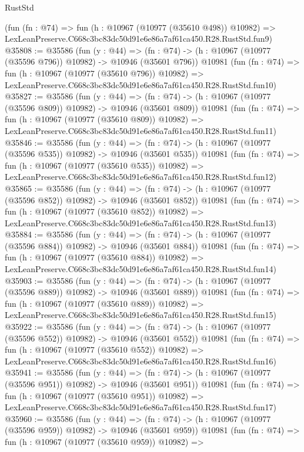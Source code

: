 \begin{lexlean}{RustStd}
\begin{coremodule}
    (fun (fn : @74) =>
    fun (h : @10967 (@10977 (@35610 @498)) @10982) =>
    LexLeanPreserve.C668c3bc83dc50d91e6e86a7af61ca450.R28.RustStd.fun9)
@35808 := @35586
    (fun (y : @44) =>
    (fn : @74) -> (h : @10967 (@10977 (@35596 @796)) @10982) -> @10946 (@35601 @796))
    @10981
    (fun (fn : @74) =>
    fun (h : @10967 (@10977 (@35610 @796)) @10982) =>
    LexLeanPreserve.C668c3bc83dc50d91e6e86a7af61ca450.R28.RustStd.fun10)
@35827 := @35586
    (fun (y : @44) =>
    (fn : @74) -> (h : @10967 (@10977 (@35596 @809)) @10982) -> @10946 (@35601 @809))
    @10981
    (fun (fn : @74) =>
    fun (h : @10967 (@10977 (@35610 @809)) @10982) =>
    LexLeanPreserve.C668c3bc83dc50d91e6e86a7af61ca450.R28.RustStd.fun11)
@35846 := @35586
    (fun (y : @44) =>
    (fn : @74) -> (h : @10967 (@10977 (@35596 @535)) @10982) -> @10946 (@35601 @535))
    @10981
    (fun (fn : @74) =>
    fun (h : @10967 (@10977 (@35610 @535)) @10982) =>
    LexLeanPreserve.C668c3bc83dc50d91e6e86a7af61ca450.R28.RustStd.fun12)
@35865 := @35586
    (fun (y : @44) =>
    (fn : @74) -> (h : @10967 (@10977 (@35596 @852)) @10982) -> @10946 (@35601 @852))
    @10981
    (fun (fn : @74) =>
    fun (h : @10967 (@10977 (@35610 @852)) @10982) =>
    LexLeanPreserve.C668c3bc83dc50d91e6e86a7af61ca450.R28.RustStd.fun13)
@35884 := @35586
    (fun (y : @44) =>
    (fn : @74) -> (h : @10967 (@10977 (@35596 @884)) @10982) -> @10946 (@35601 @884))
    @10981
    (fun (fn : @74) =>
    fun (h : @10967 (@10977 (@35610 @884)) @10982) =>
    LexLeanPreserve.C668c3bc83dc50d91e6e86a7af61ca450.R28.RustStd.fun14)
@35903 := @35586
    (fun (y : @44) =>
    (fn : @74) -> (h : @10967 (@10977 (@35596 @889)) @10982) -> @10946 (@35601 @889))
    @10981
    (fun (fn : @74) =>
    fun (h : @10967 (@10977 (@35610 @889)) @10982) =>
    LexLeanPreserve.C668c3bc83dc50d91e6e86a7af61ca450.R28.RustStd.fun15)
@35922 := @35586
    (fun (y : @44) =>
    (fn : @74) -> (h : @10967 (@10977 (@35596 @552)) @10982) -> @10946 (@35601 @552))
    @10981
    (fun (fn : @74) =>
    fun (h : @10967 (@10977 (@35610 @552)) @10982) =>
    LexLeanPreserve.C668c3bc83dc50d91e6e86a7af61ca450.R28.RustStd.fun16)
@35941 := @35586
    (fun (y : @44) =>
    (fn : @74) -> (h : @10967 (@10977 (@35596 @951)) @10982) -> @10946 (@35601 @951))
    @10981
    (fun (fn : @74) =>
    fun (h : @10967 (@10977 (@35610 @951)) @10982) =>
    LexLeanPreserve.C668c3bc83dc50d91e6e86a7af61ca450.R28.RustStd.fun17)
@35960 := @35586
    (fun (y : @44) =>
    (fn : @74) -> (h : @10967 (@10977 (@35596 @959)) @10982) -> @10946 (@35601 @959))
    @10981
    (fun (fn : @74) =>
    fun (h : @10967 (@10977 (@35610 @959)) @10982) =>

\end{coremodule}
\end{lexlean}
